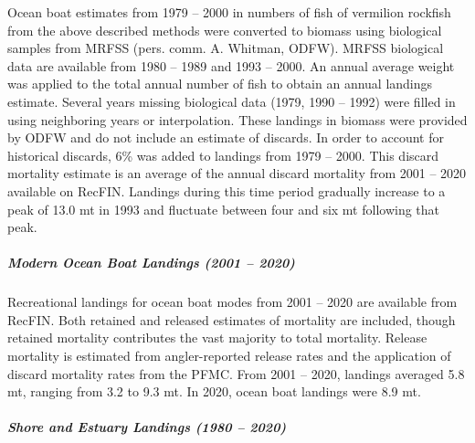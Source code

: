 \documentclass[11pt,
  english,
  a4paper,
]{article}
\begin{document}
\leavevmode\tagmcend\tagstructend\par


Ocean boat estimates from 1979 -- 2000 in numbers of fish of vermilion rockfish from the above described methods were converted to biomass using biological samples from MRFSS (pers. comm. A. Whitman, ODFW). MRFSS biological data are available from 1980 -- 1989 and 1993 -- 2000. An annual average weight was applied to the total annual number of fish to obtain an annual landings estimate. Several years missing biological data (1979, 1990 -- 1992) were filled in using neighboring years or interpolation. These landings in biomass were provided by ODFW and do not include an estimate of discards. In order to account for historical discards, 6\% was added to landings from 1979 -- 2000. This discard mortality estimate is an average of the annual discard mortality from 2001 -- 2020 available on RecFIN. Landings during this time period gradually increase to a peak of 13.0 mt in 1993 and fluctuate between four and six mt following that peak.

\leavevmode\tagmcend\tagstructend\par


\hypertarget{modern-ocean-boat-landings-2001-2020}{%
\subparagraph{Modern Ocean Boat Landings (2001 -- 2020)}\label{modern-ocean-boat-landings-2001-2020}}

\leavevmode\tagmcend\tagstructend


Recreational landings for ocean boat modes from 2001 -- 2020 are available from RecFIN. Both retained and released estimates of mortality are included, though retained mortality contributes the vast majority to total mortality. Release mortality is estimated from angler-reported release rates and the application of discard mortality rates from the PFMC. From 2001 -- 2020, landings averaged 5.8 mt, ranging from 3.2 to 9.3 mt. In 2020, ocean boat landings were 8.9 mt.

\leavevmode\tagmcend\tagstructend\par


\hypertarget{shore-and-estuary-landings-1980-2020}{%
\subparagraph{Shore and Estuary Landings (1980 -- 2020)}\label{shore-and-estuary-landings-1980-2020}}
\end{document}

